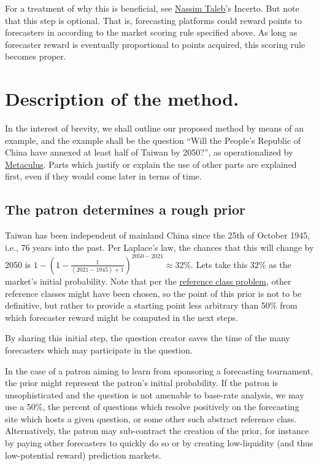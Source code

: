 \documentclass[]{article}
\begin{document}
For a treatment of why this is beneficial, see
\href{https://twitter.com/nntaleb}{Nassim Taleb}'s Incerto. But note
that this step is optional. That is, forecasting platforms could reward
points to forecasters in according to the market scoring rule specified
above. As long as forecaster reward is eventually proportional to points
acquired, this scoring rule becomes proper.

\hypertarget{description-of-the-method.}{%
\section{Description of the method.}\label{description-of-the-method.}}

In the interest of brevity, we shall outline our proposed method by
means of an example, and the example shall be the question ``Will the
People's Republic of China have annexed at least half of Taiwan by
2050?'', as operationalized by
\href{https://www.metaculus.com/questions/5320/chinese-annexation-of-most-of-taiwan-by-2050/}{Metaculus}.
Parts which justify or explain the use of other parts are explained
first, even if they would come later in terms of time.

\hypertarget{the-patron-determines-a-rough-prior}{%
\subsection{The patron determines a rough
prior}\label{the-patron-determines-a-rough-prior}}

Taiwan has been independent of mainland China since the 25th of October
1945, i.e., 76 years into the past. Per Laplace's law, the chances that
this will change by 2050 is
\(1-(1-\frac{1}{(2021-1945)+1})^{2050-2021} \approx 32\%\). Lets take
this \(32\%\) as the market's initial probability. Note that per the
\href{https://en.wikipedia.org/wiki/Reference_class_problem}{reference
class problem}, other reference classes might have been chosen, so the
point of this prior is not to be definitive, but rather to provide a
starting point less arbitrary than 50\% from which forecaster reward
might be computed in the next steps.

By sharing this initial step, the question creator saves the time of the
many forecasters which may participate in the question.

In the case of a patron aiming to learn from sponsoring a forecasting
tournament, the prior might represent the patron's initial probability.
If the patron is unsophisticated and the question is not amenable to
base-rate analysis, we may use a 50\%, the percent of questions which
resolve positively on the forecasting site which hosts a given question,
or some other such abstract reference class. Alternatively, the patron
may sub-contract the creation of the prior, for instance by paying other
forecasters to quickly do so or by creating low-liquidity (and thus
low-potential reward) prediction markets.
\end{document}
